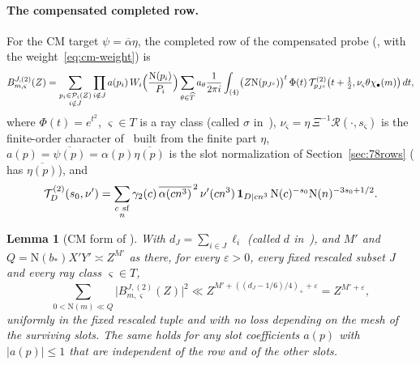 \documentclass[11pt]{article}
\numberwithin{equation}{section}
\newcommand{\N}{\mathrm N}
\newcommand{\ind}{\mathbf1}
\newtheorem{lemma}{Lemma}
\begin{document}
\paragraph{The compensated completed row.} For the CM target $\psi=\overline\alpha\eta$, the completed row of the
compensated probe (\cite[Section~15.1]{OAI78}, with the weight~\eqref{eq:cm-weight}) is
\begin{equation}\label{eq:d144}
 B^{J,(2)}_{m,\varsigma}(Z)=\sum_{\substack{p_i\in\mathcal P_i(Z)\\i\notin J}}\prod_{i\notin J}a(p_i)\,
 W_i\Bigl(\frac{\N(p_i)}{P_i}\Bigr)\sum_{\theta\in\widehat T}a_\theta\frac1{2\pi i}\int_{(4)}
 \bigl(Z\N(p_{J^c})\bigr)^t\,\Phi(t)\,\mathcal T^{(2)}_{p_{J^c}}\bigl(t+\tfrac12,\nu_\varsigma\theta\chi_\bullet(m)\bigr)\,dt,
\end{equation}
where $\Phi(t)=e^{t^2}$, $\varsigma\in T$ is a ray class (called $\sigma$ in~\cite{OAI78}),
$\nu_\varsigma=\eta\,\Xi^{-1}\mathcal R(\cdot,s_\varsigma)$ is the finite-order character
of~\cite[Section~6.1]{OAI78} built from the finite part $\eta$, $a(p)=\overline{\psi(p)}=\alpha(p)\overline{\eta(p)}$
is the slot normalization of Section~\ref{sec:78rows} (\cite{OAI78} has $\overline{\eta(p)}$), and
\begin{equation}\label{eq:d145}
 \mathcal T^{(2)}_D(s_0,\nu')=\sum_{\substack{c\ {\rm sf}\\n}}\gamma_2(c)\,\overline{\alpha(cn^3)}^{\,2}\,
 \nu'(cn^3)\,\ind_{D\mid cn^3}\,\N(c)^{-s_0}\N(n)^{-3s_0+1/2}.
\end{equation}

\begin{lemma}[CM form of {\cite[Lemma~15.1]{OAI78}}]\label{lem:s1-probe-row-norm}
With $d_J=\sum_{i\in J}\ell_i$ (called $d$ in~\cite[eq.~(15.1)]{OAI78}), and $M'$ and $Q=\N(b_*)X'Y'\asymp Z^{M'}$ as there, for every $\varepsilon>0$, every
fixed rescaled subset $J$ and every ray class $\varsigma\in T$,
\begin{equation}\label{eq:d146}
 \sum_{0<\N(m)\ll Q}\bigl|B^{J,(2)}_{m,\varsigma}(Z)\bigr|^2\ll Z^{M'+((d_J-1/6)/4)_++\varepsilon}=Z^{M'+\varepsilon},
\end{equation}
uniformly in the fixed rescaled tuple and with no loss depending on the mesh of the surviving slots. The same holds
for any slot coefficients $a(p)$ with $|a(p)|\le1$ that are independent of the row and of the other slots.
\end{lemma}
\end{document}
